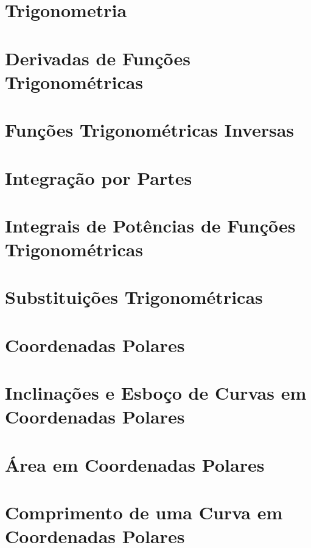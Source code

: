 \documentclass{svmono}
\begin{document}
\section{Trigonometria}
\label{sec:trigonometry}

\section{Derivadas de Funções Trigonométricas}
\label{sec:derivtrig}

\section{Funções Trigonométricas Inversas}
\label{sec:invtrig}

\section{Integração por Partes}
\label{sec:intparts}

\section{Integrais de Potências de Funções Trigonométricas}
\label{sec:intpowtrig}

\section{Substituições Trigonométricas}
\label{sec:trigsubst}

\section{Coordenadas Polares}
\label{sec:polarcoord}

\section{Inclinações e Esboço de Curvas em Coordenadas Polares}
\label{sec:polarsketch}

\section{Área em Coordenadas Polares}
\label{sec:polararea}

\section{Comprimento de uma Curva em Coordenadas Polares}
\label{sec:polarlength}
\end{document}
